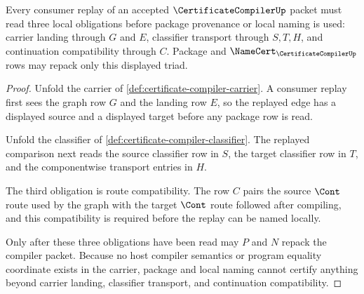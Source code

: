 \begin{theorem}
\label{thm:certificate-compiler-consumer-replay-obligation-triad}
Every consumer replay of an accepted $\CertificateCompilerUp$ packet must read three local obligations before package provenance or local naming is used: carrier landing through $G$ and $E$, classifier transport through $S,T,H$, and continuation compatibility through $C$. Package and $\NameCert_{\CertificateCompilerUp}$ rows may repack only this displayed triad.
\end{theorem}
\begin{proof}
Unfold the carrier of \autoref{def:certificate-compiler-carrier}. A consumer replay first sees the graph row $G$ and the landing row $E$, so the replayed edge has a displayed source and a displayed target before any package row is read.

Unfold the classifier of \autoref{def:certificate-compiler-classifier}. The replayed comparison next reads the source classifier row in $S$, the target classifier row in $T$, and the componentwise transport entries in $H$.

The third obligation is route compatibility. The row $C$ pairs the source $\Cont$ route used by the graph with the target $\Cont$ route followed after compiling, and this compatibility is required before the replay can be named locally.

Only after these three obligations have been read may $P$ and $N$ repack the compiler packet. Because no host compiler semantics or program equality coordinate exists in the carrier, package and local naming cannot certify anything beyond carrier landing, classifier transport, and continuation compatibility.
\end{proof}


